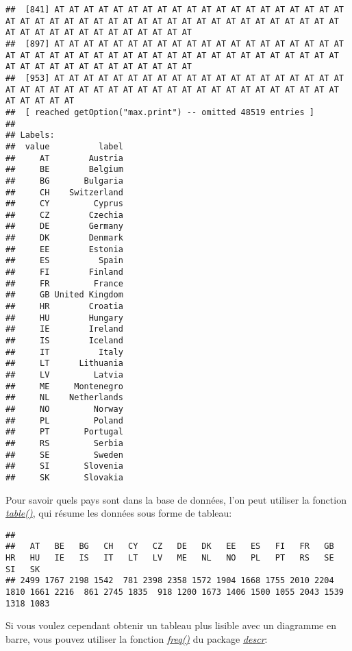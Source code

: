 \documentclass[
]{book}
\newenvironment{Shaded}{\begin{snugshade}}{\end{snugshade}}
\newcommand{\FunctionTok}[1]{\textcolor[rgb]{0.00,0.00,0.00}{#1}}
\newcommand{\NormalTok}[1]{#1}
\newcommand{\SpecialCharTok}[1]{\textcolor[rgb]{0.00,0.00,0.00}{#1}}
\begin{document}
\begin{verbatim}
##  [841] AT AT AT AT AT AT AT AT AT AT AT AT AT AT AT AT AT AT AT AT AT AT AT AT AT AT AT AT AT AT AT AT AT AT AT AT AT AT AT AT AT AT AT AT AT AT AT AT AT AT AT AT AT AT AT AT
##  [897] AT AT AT AT AT AT AT AT AT AT AT AT AT AT AT AT AT AT AT AT AT AT AT AT AT AT AT AT AT AT AT AT AT AT AT AT AT AT AT AT AT AT AT AT AT AT AT AT AT AT AT AT AT AT AT AT
##  [953] AT AT AT AT AT AT AT AT AT AT AT AT AT AT AT AT AT AT AT AT AT AT AT AT AT AT AT AT AT AT AT AT AT AT AT AT AT AT AT AT AT AT AT AT AT AT AT AT
##  [ reached getOption("max.print") -- omitted 48519 entries ]
## 
## Labels:
##  value          label
##     AT        Austria
##     BE        Belgium
##     BG       Bulgaria
##     CH    Switzerland
##     CY         Cyprus
##     CZ        Czechia
##     DE        Germany
##     DK        Denmark
##     EE        Estonia
##     ES          Spain
##     FI        Finland
##     FR         France
##     GB United Kingdom
##     HR        Croatia
##     HU        Hungary
##     IE        Ireland
##     IS        Iceland
##     IT          Italy
##     LT      Lithuania
##     LV         Latvia
##     ME     Montenegro
##     NL    Netherlands
##     NO         Norway
##     PL         Poland
##     PT       Portugal
##     RS         Serbia
##     SE         Sweden
##     SI       Slovenia
##     SK       Slovakia
\end{verbatim}

Pour savoir quels pays sont dans la base de données, l'on peut utiliser la fonction \href{https://www.rdocumentation.org/packages/base/versions/3.6.2/topics/table}{\emph{table()}}, qui résume les données sous forme de tableau:

\begin{Shaded}
\end{Shaded}

\begin{verbatim}
## 
##   AT   BE   BG   CH   CY   CZ   DE   DK   EE   ES   FI   FR   GB   HR   HU   IE   IS   IT   LT   LV   ME   NL   NO   PL   PT   RS   SE   SI   SK 
## 2499 1767 2198 1542  781 2398 2358 1572 1904 1668 1755 2010 2204 1810 1661 2216  861 2745 1835  918 1200 1673 1406 1500 1055 2043 1539 1318 1083
\end{verbatim}

Si vous voulez cependant obtenir un tableau plus lisible avec un diagramme en barre, vous pouvez utiliser la fonction \href{https://www.rdocumentation.org/packages/descr/versions/1.1.5/topics/freq}{\emph{freq()}} du package \href{https://cran.r-project.org/web/packages/descr/index.html}{\emph{descr}}:
\end{document}
